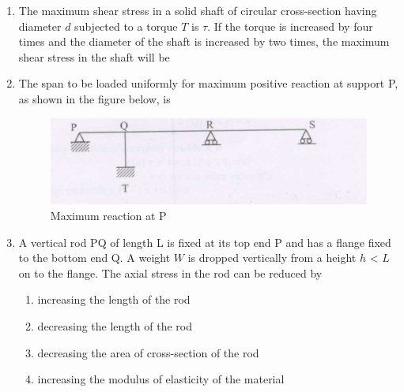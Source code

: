 \documentclass[journal]{IEEEtran}
\begin{document}
\begin{enumerate}
\item The maximum shear stress in a solid shaft of circular cross-section having diameter $d$ subjected to a torque $T$ is $\tau$. If the torque is increased by four times and the diameter of the shaft is increased by two times, the maximum shear stress in the shaft will be  \hfill {}
\begin{enumerate}
\end{enumerate}

\item The span to be loaded uniformly for maximum positive  reaction at support P, as shown in the figure below, is \hfill {}
\begin{figure}[H]
    \centering
    \includegraphics[width=0.6\columnwidth]{figs/fig8.png} 
    \caption{Maximum reaction at P}
    \label{fig:placeholder}
\end{figure}



\begin{enumerate}
\end{enumerate}

\item A vertical rod PQ of length L is fixed at its top end P and has a flange fixed to the bottom end Q. A weight $W$ is dropped vertically from a height $h$ < $L$ on to the flange. The axial stress in the rod can be reduced by \hfill {}

\begin{enumerate}
\item increasing the length of the rod 
\item decreasing the length of the rod
\item decreasing the area of cross-section of the rod
\item increasing the modulus of elasticity of the material
\end{enumerate}


\end{enumerate}
\end{document}
